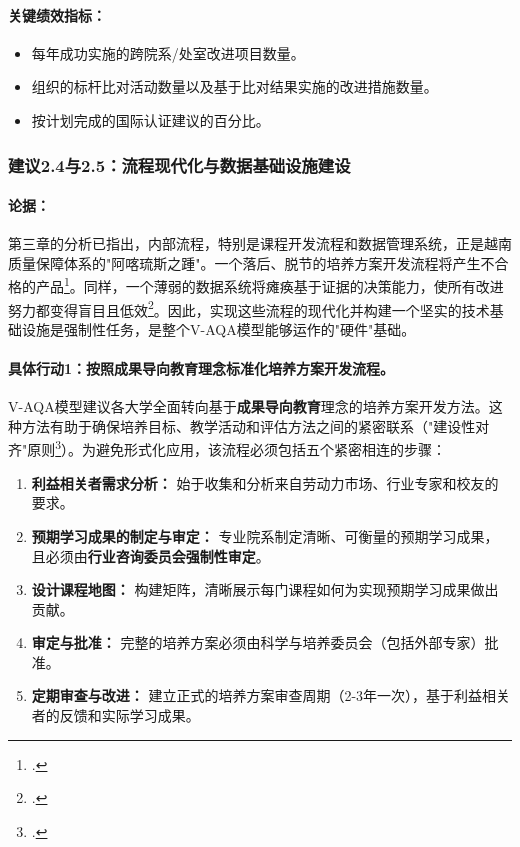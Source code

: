 \paragraph{关键绩效指标：}
\begin{itemize}
    \item 每年成功实施的跨院系/处室改进项目数量。
    \item 组织的标杆比对活动数量以及基于比对结果实施的改进措施数量。
    \item 按计划完成的国际认证建议的百分比。
\end{itemize}

\subsubsection{建议2.4与2.5：流程现代化与数据基础设施建设}

\paragraph{论据：}
第三章的分析已指出，内部流程，特别是课程开发流程和数据管理系统，正是越南质量保障体系的"阿喀琉斯之踵"。一个落后、脱节的培养方案开发流程将产生不合格的产品\footcite{ijlter_elo_copy}。同样，一个薄弱的数据系统将瘫痪基于证据的决策能力，使所有改进努力都变得盲目且低效\footcite{aunsec_redesigningIQA}。因此，实现这些流程的现代化并构建一个坚实的技术基础设施是强制性任务，是整个V-AQA模型能够运作的"硬件"基础。

\paragraph{具体行动1：按照成果导向教育理念标准化培养方案开发流程。}
V-AQA模型建议各大学全面转向基于\textbf{成果导向教育}理念的培养方案开发方法。这种方法有助于确保培养目标、教学活动和评估方法之间的紧密联系（"建设性对齐"原则\footcite{biggs_constructive_alignment}）。为避免形式化应用，该流程必须包括五个紧密相连的步骤：
\begin{enumerate}
    \item \textbf{利益相关者需求分析：} 始于收集和分析来自劳动力市场、行业专家和校友的要求。
    \item \textbf{预期学习成果的制定与审定：} 专业院系制定清晰、可衡量的预期学习成果，且必须由\textbf{行业咨询委员会强制性审定}。
    \item \textbf{设计课程地图：} 构建矩阵，清晰展示每门课程如何为实现预期学习成果做出贡献。
    \item \textbf{审定与批准：} 完整的培养方案必须由科学与培养委员会（包括外部专家）批准。
    \item \textbf{定期审查与改进：} 建立正式的培养方案审查周期（2-3年一次），基于利益相关者的反馈和实际学习成果。
\end{enumerate}

